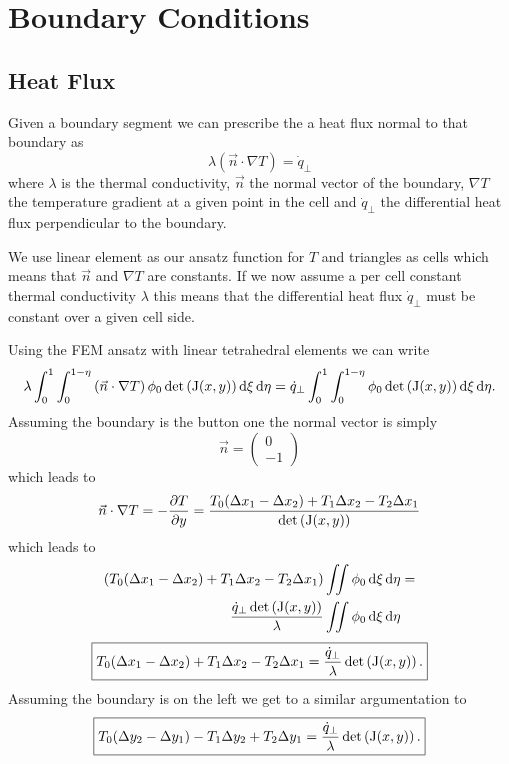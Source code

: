 \chapter{Boundary Conditions}

\section{Heat Flux}
Given a boundary segment we can prescribe the a heat flux normal to that boundary as
\begin{equation}
	\lambda \left(\vec{n} \cdot \nabla T \right) = \dot{q}_{\perp}
\end{equation}
where $\lambda$ is the thermal conductivity, $\vec{n}$ the normal vector of the boundary, $\nabla T$ the temperature gradient at a given point in the cell and $\dot{q}_{\perp}$ the differential heat flux perpendicular to the boundary.

We use linear element as our ansatz function for $T$ and triangles as cells which means that $\vec{n}$ and $\nabla T$ are constants.
If we now assume a per cell constant thermal conductivity $\lambda$ this means that the differential heat flux $\dot{q}_{\perp}$ must be constant over a given cell side.

Using the FEM ansatz with linear tetrahedral elements we can write
\begin{equation}
	\lambda \int_0^1 \int_0^{1 - \eta} \left( \vec{n} \cdot \nabla T \right) \phi_0 \det\left( \mathrm{J}(x, y) \right) \mathop{}\!\mathrm{d}{\xi} \mathop{}\!\mathrm{d}{\eta} = \dot{q}_{\perp} \int_0^1 \int_0^{1 - \eta} \phi_0 \det\left( \mathrm{J}(x, y) \right) \mathop{}\!\mathrm{d}{\xi} \mathop{}\!\mathrm{d}{\eta}.
\end{equation}
Assuming the boundary is the button one the normal vector is simply
\begin{equation}
	\vec{n} = 
	\begin{pmatrix}
	0\\
	-1
	\end{pmatrix}
\end{equation}
which leads to
\begin{equation}
	\vec{n} \cdot \nabla T = -\pdv{T}{y} = \frac{T_0(\Delta x_1 - \Delta x_2) + T_1 \Delta x_2 - T_2 \Delta x_1}{\det\left(\mathrm{J}(x,y)\right)}
\end{equation}
which leads to
\begin{align}
	\left( T_0(\Delta x_1 - \Delta x_2) + T_1 \Delta x_2 - T_2 \Delta x_1\right) &\iint \phi_0 \mathop{}\!\mathrm{d}{\xi} \mathop{}\!\mathrm{d}{\eta} =\\
	\frac{\dot{q}_{\perp} \det\left( \mathrm{J}(x, y) \right)}{\lambda} &\iint \phi_0 \mathop{}\!\mathrm{d}{\xi} \mathop{}\!\mathrm{d}{\eta}
\end{align}
\begin{equation}
	\boxed{T_0(\Delta x_1 - \Delta x_2) + T_1 \Delta x_2 - T_2 \Delta x_1 =
	\frac{\dot{q}_{\perp}}{\lambda} \det\left( \mathrm{J}(x, y) \right).}
\end{equation}
Assuming the boundary is on the left we get to a similar argumentation to
\begin{equation}
	\boxed{T_0(\Delta y_2 - \Delta y_1) - T_1\Delta y_2 + T_2\Delta y_1 =
	\frac{\dot{q}_{\perp}}{\lambda} \det\left( \mathrm{J}(x, y) \right).}
\end{equation}

